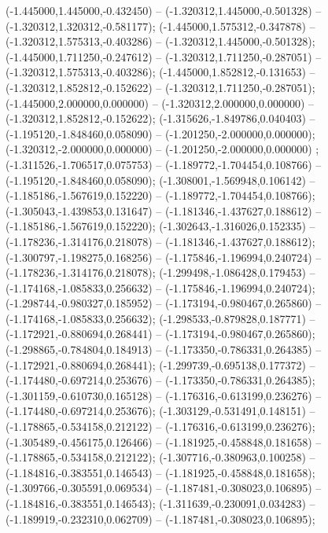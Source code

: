  (-1.445000,1.445000,-0.432450) -- (-1.320312,1.445000,-0.501328) -- (-1.320312,1.320312,-0.581177);
 (-1.445000,1.575312,-0.347878) -- (-1.320312,1.575313,-0.403286) -- (-1.320312,1.445000,-0.501328);
 (-1.445000,1.711250,-0.247612) -- (-1.320312,1.711250,-0.287051) -- (-1.320312,1.575313,-0.403286);
 (-1.445000,1.852812,-0.131653) -- (-1.320312,1.852812,-0.152622) -- (-1.320312,1.711250,-0.287051);
 (-1.445000,2.000000,0.000000) -- (-1.320312,2.000000,0.000000) -- (-1.320312,1.852812,-0.152622);
 (-1.315626,-1.849786,0.040403) -- (-1.195120,-1.848460,0.058090) -- (-1.201250,-2.000000,0.000000);
 (-1.320312,-2.000000,0.000000) -- (-1.201250,-2.000000,0.000000) ;
 (-1.311526,-1.706517,0.075753) -- (-1.189772,-1.704454,0.108766) -- (-1.195120,-1.848460,0.058090);
 (-1.308001,-1.569948,0.106142) -- (-1.185186,-1.567619,0.152220) -- (-1.189772,-1.704454,0.108766);
 (-1.305043,-1.439853,0.131647) -- (-1.181346,-1.437627,0.188612) -- (-1.185186,-1.567619,0.152220);
 (-1.302643,-1.316026,0.152335) -- (-1.178236,-1.314176,0.218078) -- (-1.181346,-1.437627,0.188612);
 (-1.300797,-1.198275,0.168256) -- (-1.175846,-1.196994,0.240724) -- (-1.178236,-1.314176,0.218078);
 (-1.299498,-1.086428,0.179453) -- (-1.174168,-1.085833,0.256632) -- (-1.175846,-1.196994,0.240724);
 (-1.298744,-0.980327,0.185952) -- (-1.173194,-0.980467,0.265860) -- (-1.174168,-1.085833,0.256632);
 (-1.298533,-0.879828,0.187771) -- (-1.172921,-0.880694,0.268441) -- (-1.173194,-0.980467,0.265860);
 (-1.298865,-0.784804,0.184913) -- (-1.173350,-0.786331,0.264385) -- (-1.172921,-0.880694,0.268441);
 (-1.299739,-0.695138,0.177372) -- (-1.174480,-0.697214,0.253676) -- (-1.173350,-0.786331,0.264385);
 (-1.301159,-0.610730,0.165128) -- (-1.176316,-0.613199,0.236276) -- (-1.174480,-0.697214,0.253676);
 (-1.303129,-0.531491,0.148151) -- (-1.178865,-0.534158,0.212122) -- (-1.176316,-0.613199,0.236276);
 (-1.305489,-0.456175,0.126466) -- (-1.181925,-0.458848,0.181658) -- (-1.178865,-0.534158,0.212122);
 (-1.307716,-0.380963,0.100258) -- (-1.184816,-0.383551,0.146543) -- (-1.181925,-0.458848,0.181658);
 (-1.309766,-0.305591,0.069534) -- (-1.187481,-0.308023,0.106895) -- (-1.184816,-0.383551,0.146543);
 (-1.311639,-0.230091,0.034283) -- (-1.189919,-0.232310,0.062709) -- (-1.187481,-0.308023,0.106895);
